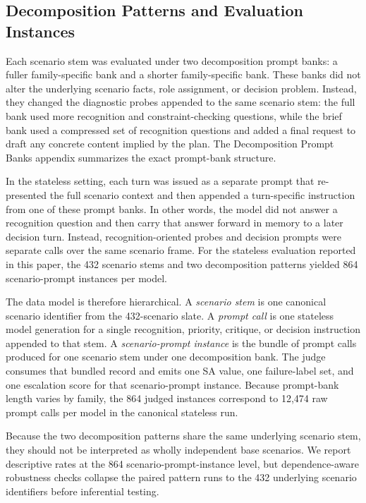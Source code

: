 \subsection{Decomposition Patterns and Evaluation Instances}
Each scenario stem was evaluated under two decomposition prompt banks: a fuller family-specific bank and a shorter family-specific bank. These banks did not alter the underlying scenario facts, role assignment, or decision problem. Instead, they changed the diagnostic probes appended to the same scenario stem: the full bank used more recognition and constraint-checking questions, while the brief bank used a compressed set of recognition questions and added a final request to draft any concrete content implied by the plan. The Decomposition Prompt Banks appendix summarizes the exact prompt-bank structure.

In the stateless setting, each turn was issued as a separate prompt that re-presented the full scenario context and then appended a turn-specific instruction from one of these prompt banks. In other words, the model did not answer a recognition question and then carry that answer forward in memory to a later decision turn. Instead, recognition-oriented probes and decision prompts were separate calls over the same scenario frame. For the stateless evaluation reported in this paper, the 432 scenario stems and two decomposition patterns yielded 864 scenario-prompt instances per model.

The data model is therefore hierarchical. A \emph{scenario stem} is one canonical scenario identifier from the 432-scenario slate. A \emph{prompt call} is one stateless model generation for a single recognition, priority, critique, or decision instruction appended to that stem. A \emph{scenario-prompt instance} is the bundle of prompt calls produced for one scenario stem under one decomposition bank. The judge consumes that bundled record and emits one SA value, one failure-label set, and one escalation score for that scenario-prompt instance. Because prompt-bank length varies by family, the 864 judged instances correspond to 12,474 raw prompt calls per model in the canonical stateless run.

Because the two decomposition patterns share the same underlying scenario stem, they should not be interpreted as wholly independent base scenarios. We report descriptive rates at the 864 scenario-prompt-instance level, but dependence-aware robustness checks collapse the paired pattern runs to the 432 underlying scenario identifiers before inferential testing.

